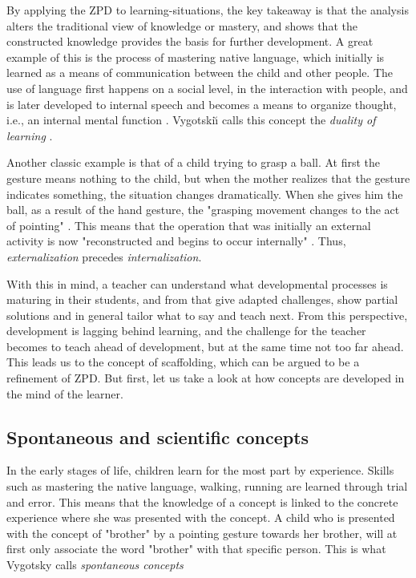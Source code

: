 By applying the ZPD to learning-situations, the key takeaway is that the analysis alters the traditional view of knowledge or mastery, and shows that the constructed knowledge provides the basis for further development. A great example of this is the process of mastering native language, which initially is learned as a means of communication between the child and other people. The use of language first happens on a social level, in the interaction with people, and is later developed to internal speech and becomes a means to organize thought, i.e., an internal mental function . Vygotski{\u\i} calls this concept the \textit{duality of learning} \citep{vygotskiui1978mind}. 

Another classic example is that of a child trying to grasp a ball. At first the gesture means nothing to the child, but when the mother realizes that the gesture indicates something, the situation changes dramatically. When she gives him the ball, as a result of the hand gesture, the "grasping movement changes to the act of pointing" \citep{vygotskiui1978mind}. This means that the operation that was initially an external activity is now "reconstructed and begins to occur internally" \citep{vygotskiui1978mind}. Thus, \textit{externalization} precedes \textit{internalization}. 

With this in mind, a teacher can understand what developmental processes is maturing in their students, and from that give adapted challenges, show partial solutions and in general tailor what to say and teach next. From this perspective, development is lagging behind learning, and the challenge for the teacher becomes to teach ahead of development, but at the same time not too far ahead. This leads us to the concept of scaffolding, which can be argued to be a refinement of ZPD. But first, let us take a look at how concepts are developed in the mind of the learner. 

\subsection{Spontaneous and scientific concepts} 
In the early stages of life, children learn for the most part by experience. Skills such as mastering the native language, walking, running are learned through trial and error. This means that the knowledge of a concept is linked to the concrete experience where she was presented with the concept. A child who is presented with the concept of "brother" by a pointing gesture towards her brother, will at first only associate the word "brother" with that specific person. This is what Vygotsky calls \emph{spontaneous concepts}

